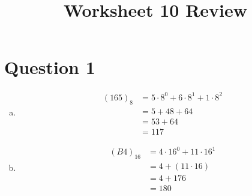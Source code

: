 \documentclass[12pt]{article}
\begin{document}
\title{Worksheet 10 Review}
\maketitle

\section*{Question 1}
\begin{enumerate}[a.]
    \item
    \begin{align}
        (165)_8 &= 5 \cdot 8^0 + 6 \cdot 8^1 + 1 \cdot 8^2\\
        &= 5 + 48 + 64\\
        &= 53 + 64\\
        &= 117
    \end{align}

    \item
    \setcounter{equation}{0}
    \begin{align}
        (B4)_{16} &= 4 \cdot 16^0 + 11 \cdot 16^1\\
        &= 4 + (11 \cdot 16)\\
        &= 4 + 176\\
        &= 180
    \end{align}
\end{enumerate}
\end{document}
